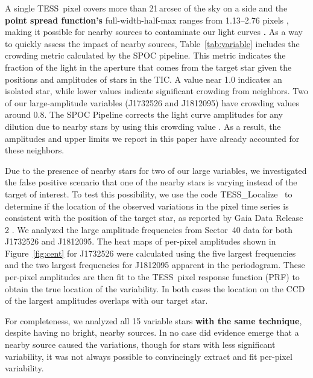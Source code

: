 \documentclass[twocolumn, linenumbers]{aastex631}
\newcommand{\tess}{TESS}
\newcommand{\tesslocalize}{{{\fontfamily{lmtt}\selectfont
\newcommand{\Msun}      {\>{\rm M_{\odot}}}
TESS\_Localize}}}
\begin{document}
A single \tess\ pixel covers more than 21\,arcsec of the sky on a side and the \textbf{point spread function's} full-width-half-max ranges from 1.13--2.76 pixels \citep{oelkers2018}, making it possible for nearby sources to contaminate our light curves \textbf{\citep[such as that seen in exoplanet catalogs, see][]{Coughlin2014AJ}.} As a way to quickly assess the impact of nearby sources, Table~\ref{tab:variable} includes the crowding metric calculated by the SPOC pipeline.  This metric indicates the fraction of the light in the aperture that comes from the target star given the positions and amplitudes of stars in the TIC.  A value near 1.0 indicates an isolated star, while lower values indicate significant crowding from neighbors.  Two of our large-amplitude variables (J1732526 and J1812095) have crowding values around 0.8.  The SPOC Pipeline corrects the light curve amplitudes for any dilution due to nearby stars by using this crowding value \citep{FausnaughDRN}.  As a result, the amplitudes and upper limits we report in this paper have already accounted for these neighbors.


Due to the presence of nearby stars for two of our large variables, we investigated the false positive scenario that one of the nearby stars is varying instead of the target of interest. To test this possibility, we use the code \tesslocalize\ \citep{HiggensBell} to determine if the location of the observed variations in the pixel time series is consistent with the position of the target star, as reported by Gaia Data Release 2 \citep{gaiaDR22018}.  We analyzed the large amplitude frequencies from Sector~40 data for both J1732526 and J1812095. The heat maps of per-pixel amplitudes shown in Figure~\ref{fig:cent} for J1732526 were calculated using the five largest frequencies and the two largest frequencies for J1812095 apparent in the periodogram.  These per-pixel amplitudes are then fit to the \tess\ pixel response function (PRF) to obtain the true location of the variability. In both cases the location on the CCD of the largest amplitudes overlaps with our target star. 

For completeness, we analyzed all 15 variable stars \textbf{with the same technique}, despite having no bright, nearby sources. In no case did evidence emerge that a nearby source caused the variations, though for stars with less significant variability, it was not always possible to convincingly extract and fit per-pixel variability.
\end{document}
